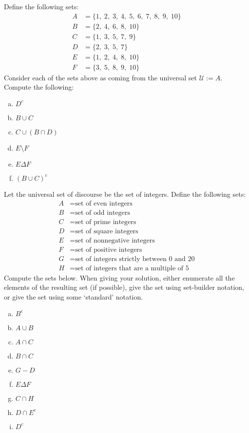 \documentclass[11pt,letterpaper]{article}
\begin{document}
 Define the following sets:
	\[
	\begin{aligned}
	A&= \{ 1, \; 2, \; 3, \; 4, \; 5, \; 6, \; 7, \; 8, \; 9, \; 10 \} \\
	B&= \{ 2, \; 4, \; 6 , \; 8, \; 10 \} \\
	C&= \{ 1, \; 3, \; 5, \; 7, \; 9 \} \\
	D&= \{ 2, \; 3, \; 5, \; 7 \} \\
	E&= \{ 1, \; 2, \; 4 , \; 8, \; 10 \} \\
	F&= \{ 3, \; 5, \; 8 , \; 9 , \; 10 \}
	\end{aligned}
	\]
Consider each of the sets above as coming from the universal set $\mathcal{U}:= A$. Compute the following:
	\begin{enumerate}[(a)]
	\item $D^c$
	\item $B \cup C$
	\item $C \cup (B \cap D)$
	\item $E \setminus F$
	\item $E \Delta F$
	\item $(B \cup C)^c$
	\end{enumerate}



\newpage



 Let the universal set of discourse be the set of integers. Define the following sets:
	\[
	\begin{aligned}
	A&= \text{set of even integers} \\
	B&= \text{set of odd integers} \\
	C&= \text{set of prime integers} \\
	D&= \text{set of square integers} \\
	E&= \text{set of nonnegative integers} \\
	F&= \text{set of positive integers} \\
	G&= \text{set of integers strictly between 0 and 20} \\
	H&= \text{set of integers that are a multiple of 5}
	\end{aligned}
	\]
Compute the sets below. When giving your solution, either enumerate all the elements of the resulting set (if possible), give the set using set-builder notation, or give the set using some `standard' notation. 
	\begin{enumerate}[(a)]
	\item $B^c$
	\item $A \cup B$
	\item $A \cap C$
	\item $B \cap C$
	\item $G - D$	
	\item $E \Delta F$
	\item $C \cap H$
	\item $D \cap E^c$
	\item $D^c$
	\end{enumerate}
	
\end{document}
